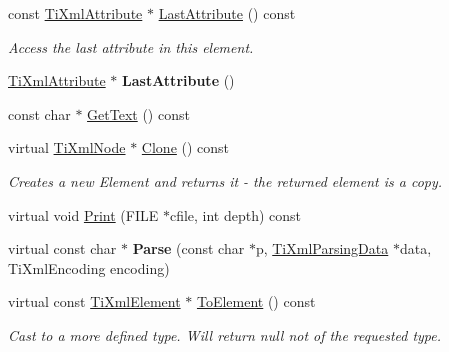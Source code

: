 \begin{DoxyCompactItemize}
const \hyperlink{class_ti_xml_attribute}{Ti\+Xml\+Attribute} $\ast$ \hyperlink{class_ti_xml_element_a42939f55ed4cec5fc1daaecfded7ba16}{Last\+Attribute} () const
\begin{DoxyCompactList}\small\item\em Access the last attribute in this element. \end{DoxyCompactList}\item 
\mbox{\label{class_ti_xml_element_a222f81cf06155cd108f2a68d4d176004}} 
\hyperlink{class_ti_xml_attribute}{Ti\+Xml\+Attribute} $\ast$ {\bfseries Last\+Attribute} ()
\item 
const char $\ast$ \hyperlink{class_ti_xml_element_af0f814ecbd43d50d4cdbdf4354d3da39}{Get\+Text} () const
\item 
\mbox{\label{class_ti_xml_element_a810ea8fa40844c01334e5af2a26794cb}} 
virtual \hyperlink{class_ti_xml_node}{Ti\+Xml\+Node} $\ast$ \hyperlink{class_ti_xml_element_a810ea8fa40844c01334e5af2a26794cb}{Clone} () const
\begin{DoxyCompactList}\small\item\em Creates a new Element and returns it -\/ the returned element is a copy. \end{DoxyCompactList}\item 
virtual void \hyperlink{class_ti_xml_element_aa31a15cddfb8601a31236fe7d2569fb4}{Print} (F\+I\+LE $\ast$cfile, int depth) const
\item 
\mbox{\label{class_ti_xml_element_af95c9165159fd9dfdcc5b894a3fcf85b}} 
virtual const char $\ast$ {\bfseries Parse} (const char $\ast$p, \hyperlink{class_ti_xml_parsing_data}{Ti\+Xml\+Parsing\+Data} $\ast$data, Ti\+Xml\+Encoding encoding)
\item 
\mbox{\label{class_ti_xml_element_a940fc8aa953e0ef0de6e110b7d98b8ee}} 
virtual const \hyperlink{class_ti_xml_element}{Ti\+Xml\+Element} $\ast$ \hyperlink{class_ti_xml_element_a940fc8aa953e0ef0de6e110b7d98b8ee}{To\+Element} () const
\begin{DoxyCompactList}\small\item\em Cast to a more defined type. Will return null not of the requested type. \end{DoxyCompactList}\item 
\mbox{\label{class_ti_xml_element_a9def86337ea7a755eb41cac980f60c7a}} 

\end{DoxyCompactItemize}
